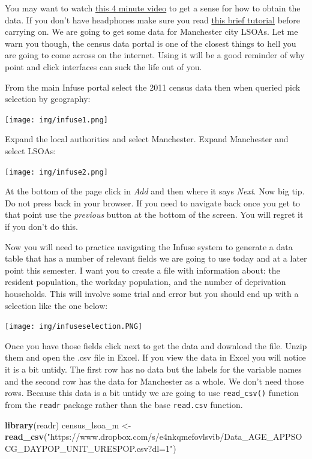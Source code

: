 \documentclass[]{book}
\newenvironment{Shaded}{\begin{snugshade}}{\end{snugshade}}
\newcommand{\KeywordTok}[1]{\textcolor[rgb]{0.13,0.29,0.53}{\textbf{#1}}}
\newcommand{\NormalTok}[1]{#1}
\newcommand{\StringTok}[1]{\textcolor[rgb]{0.31,0.60,0.02}{#1}}
\begin{document}
You may want to watch \href{https://www.youtube.com/watch?v=AzK04BOFd_s\#t=17}{this 4 minute video} to get a sense for how to obtain the data. If you don't have headphones make sure you read \href{http://infuse.ukdataservice.ac.uk/help/tutorial.html}{this brief tutorial} before carrying on. We are going to get some data for Manchester city LSOAs. Let me warn you though, the census data portal is one of the closest things to hell you are going to come across on the internet. Using it will be a good reminder of why point and click interfaces can suck the life out of you.

From the main Infuse portal select the 2011 census data then when queried pick selection by geography:

\texttt{[image: img/infuse1.png]}

Expand the local authorities and select Manchester. Expand Manchester and select LSOAs:

\texttt{[image: img/infuse2.png]}

At the bottom of the page click in \emph{Add} and then where it says \emph{Next}. Now big tip. Do not press back in your browser. If you need to navigate back once you get to that point use the \emph{previous} button at the bottom of the screen. You will regret it if you don't do this.

Now you will need to practice navigating the Infuse system to generate a data table that has a number of relevant fields we are going to use today and at a later point this semester. I want you to create a file with information about: the resident population, the workday population, and the number of deprivation households. This will involve some trial and error but you should end up with a selection like the one below:

\texttt{[image: img/infuseselection.PNG]}

Once you have those fields click next to get the data and download the file. Unzip them and open the .csv file in Excel. If you view the data in Excel you will notice it is a bit untidy. The first row has no data but the labels for the variable names and the second row has the data for Manchester as a whole. We don't need those rows. Because this data is a bit untidy we are going to use \texttt{read\_csv()} function from the \texttt{readr} package rather than the base \texttt{read.csv} function.

\begin{Shaded}
\begin{Highlighting}[]
\KeywordTok{library}\NormalTok{(readr)}
\NormalTok{census_lsoa_m <-}\StringTok{ }\KeywordTok{read_csv}\NormalTok{(}\StringTok{"https://www.dropbox.com/s/e4nkqmefovlsvib/Data_AGE_APPSOCG_DAYPOP_UNIT_URESPOP.csv?dl=1"}\NormalTok{)}
\end{Highlighting}
\end{Shaded}
\end{document}
